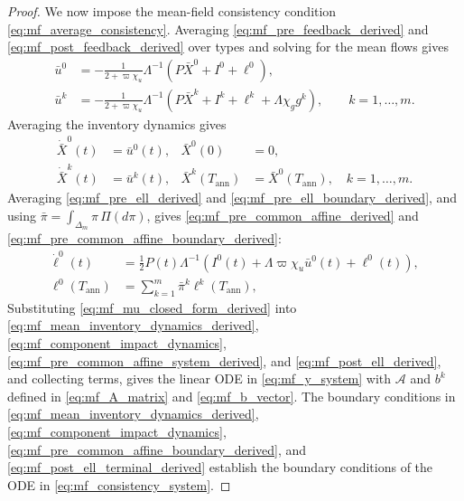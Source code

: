 \documentclass[12pt]{article}
\numberwithin{equation}{section}
\theoremstyle{definition}
\begin{document}
\begin{proof}
We now impose the mean-field consistency condition
\eqref{eq:mf_average_consistency}. Averaging
\eqref{eq:mf_pre_feedback_derived} and
\eqref{eq:mf_post_feedback_derived} over types and solving for the mean flows
gives
\begin{subequations}\label{eq:mf_mu_closed_form_derived}
\begin{align}
\bar u^0
&=-\frac{1}{2+\varpi\chi_u}\Lambda^{-1}
\left(P\bar X^0+I^0+\ell^0\right),
\label{eq:mf_pre_mu_closed_form_derived}\\
\bar u^k
&=-\frac{1}{2+\varpi\chi_u}\Lambda^{-1}
\left(P\bar X^k+I^k+\ell^k+\Lambda\chi_g g^k\right),
\qquad k=1,\ldots,m.
\label{eq:mf_post_mu_closed_form_derived}
\end{align}
\end{subequations}
Averaging the inventory dynamics gives
\begin{subequations}\label{eq:mf_mean_inventory_dynamics_derived}
\begin{align}
\dot{\bar X}^0(t)&=\bar u^0(t),
&\bar X^0(0)&=0,
\label{eq:mf_pre_mean_inventory_dynamics_derived}\\
\dot{\bar X}^k(t)&=\bar u^k(t),
&\bar X^k(T_{\mathrm{ann}})&=\bar X^0(T_{\mathrm{ann}}),
\quad k=1,\ldots,m.
\label{eq:mf_post_mean_inventory_dynamics_derived}
\end{align}
\end{subequations}
Averaging \eqref{eq:mf_pre_ell_derived} and
\eqref{eq:mf_pre_ell_boundary_derived}, and using
\(\bar\pi=\int_{\Delta_m}\pi\,\Pi(d\pi)\), gives
\eqref{eq:mf_pre_common_affine_derived} and
\eqref{eq:mf_pre_common_affine_boundary_derived}:
\begin{subequations}\label{eq:mf_pre_common_affine_system_derived}
\begin{align}
\dot \ell^0(t)
&=
\frac12P(t)\Lambda^{-1}
\left(I^0(t)+\Lambda\varpi\chi_u\bar u^0(t)+\ell^0(t)\right),
\label{eq:mf_pre_common_affine_derived}\\
\ell^0(T_{\mathrm{ann}})
&=
\sum_{k=1}^m\bar\pi^k\ell^k(T_{\mathrm{ann}}),
\label{eq:mf_pre_common_affine_boundary_derived}
\end{align}
\end{subequations}
Substituting
\eqref{eq:mf_mu_closed_form_derived} into
\eqref{eq:mf_mean_inventory_dynamics_derived},
\eqref{eq:mf_component_impact_dynamics},
\eqref{eq:mf_pre_common_affine_system_derived}, and
\eqref{eq:mf_post_ell_derived}, and collecting terms,
gives the linear ODE in \eqref{eq:mf_y_system} with \(\mathcal A\) and \(b^k\) defined in
\eqref{eq:mf_A_matrix} and \eqref{eq:mf_b_vector}.
The boundary conditions in
\eqref{eq:mf_mean_inventory_dynamics_derived},
\eqref{eq:mf_component_impact_dynamics},
\eqref{eq:mf_pre_common_affine_boundary_derived}, and
\eqref{eq:mf_post_ell_terminal_derived} establish the boundary conditions of the ODE in
\eqref{eq:mf_consistency_system}.


\end{proof}
\end{document}
